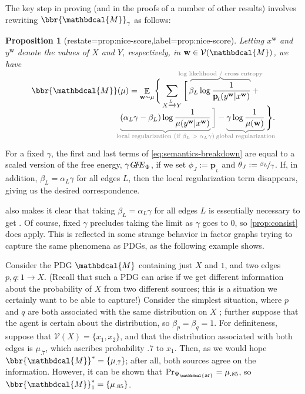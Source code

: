 \documentclass[letterpaper]{article} %
\theoremstyle{plain}
\newtheorem{prop}[theorem]{Proposition}
\theoremstyle{definition}
\theoremstyle{remark}
\DeclareMathOperator*{\Ex}{\mathbb{E}} %
\newcommand\mat[1]{\mathbf{#1}}
\newcommand{\bp}[1][L]{\mat{p}_{\!_{#1}\!}}
\newcommand{\V}{\mathcal V}
\newcommand{\dg}[1]{\mathbdcal{#1}}
\newcommand{\WFGof}[1]{\Psi_{{#1}}}
\newcommand\GFE{\mathit{G\mkern-4mu F\mkern-4.5mu E}}
\begin{document}
The key step in proving 
(and in the proofs of a number of other results) involves 
rewriting  
$\bbr{\dg M}_\gamma$ as follows: 
\begin{prop}[restate=prop:nice-score,label=prop:nice-score]%
 Letting $x^{\mat w}$ and $y^{\mat w}$ denote the values of
  $X$ and $Y$, respectively, in $\mat w \in \V(\dg M)$, 
we have 
\begin{equation}\label{eq:semantics-breakdown}
\begin{split}
\bbr{\dg M}(\mu) =  \Ex_{\mat w \sim \mu}\! \Bigg\{
 \sum_{ X \xrightarrow{\!\!L} Y  }
\bigg[\,
    \color{gray}\overbrace{\color{black}
      \!\beta_L \log \frac{1}{\bp(y^{\mat w} |x^{\mat w})}
	}^{\color{gray}\smash{\mathclap{\text{log likelihood / cross entropy}}}} + \qquad\\[-0.7em]
    \color{gray}\underbrace{\color{black} 
({\alpha_L}\gamma - \beta_L ) \log \frac{1}{\mu(y^{\mat w} |x^{\mat w})} 
	}_{\color{gray}\smash{\mathclap{\text{local regularization (if $\beta_L > 
	\alpha_L
	\gamma$)}}}}\bigg] - \underbrace{\color{black}
\gamma \log \frac{1}{\mu(\mat w)}
	}_{\color{gray}\smash{\mathclap{\text{global
        regularization}}}}\color{black} \Bigg\} .
\end{split}
\end{equation}
\end{prop}
For a fixed $\gamma$, the first and last terms
of \eqref{eq:semantics-breakdown} are equal to a scaled
version of the free energy, $\gamma\GFE_\Phi$, 
if we set $\phi_J := \bp$ and $\theta_J := \nicefrac{\beta_L}{\gamma}$.  
If, in addition, $\beta_L = {\alpha_L}\gamma$ for all
edges $L$, then
the local regularization term disappears, giving us
the desired correspondence. 


 also makes it clear that 
taking $\beta_L = {\alpha_L} \gamma$ for all edges $L$ is
essentially necessary to get .
Of course, fixed $\gamma$ precludes taking the limit as $\gamma$ goes
to 0, so 
\cref{prop:consist} does apply. This is reflected in 
some strange
behavior in factor graphs trying to capture the same phenomena as
PDGs, as the following example shows.

\begin{example}\label{ex:overdet}
Consider the PDG $\dg M$ containing just $X$ and $1$, and two edges
$p, q: 1 \to X$.
(Recall that such a PDG can arise if we get different information about the
probability of $X$ from two different 
sources; this is a situation we
certainly want to be able to capture!)
Consider the simplest situation, where $p$ and $q$ are both associated
with the same distribution on $X$%
; further suppose that the agent is certain about the distribution, so
$\beta_p = \beta_q = 1$.
For definiteness, suppose that
$\V(X) = \{x_1,x_2\}$, and
that the distribution associated with both edges is $\mu_{.7}$, which ascribes
probability $.7$ to $x_1$. Then, as we would hope  $\bbr{\dg M}^* =
\{\mu_{.7}\}$; after all, both sources agree on the information.
However, it can be shown that 
$\Pr_{\WFGof{\dg M}} = \mu_{.85}$, so  $\bbr{\dg M}_1^* = \{\mu_{.85}\}$.
\end{example}
\end{document}
